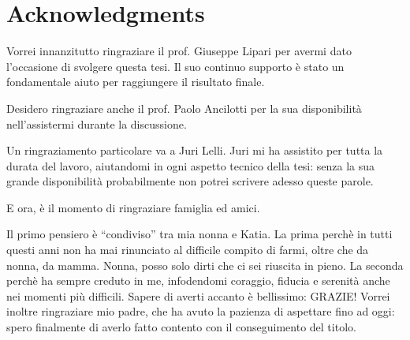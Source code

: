 \chapter{Acknowledgments}

Vorrei innanzitutto ringraziare il prof. Giuseppe Lipari per avermi dato
l'occasione di svolgere questa tesi. Il suo continuo supporto \`e stato un
fondamentale aiuto per raggiungere il risultato finale.

Desidero ringraziare anche il prof. Paolo Ancilotti per la sua disponibilit\`a
nell'assistermi durante la discussione.

Un ringraziamento particolare va a Juri Lelli. Juri mi ha assistito per
tutta la durata del lavoro, aiutandomi in ogni aspetto tecnico della tesi:
senza la sua grande disponibilit\`a probabilmente non potrei scrivere adesso 
queste parole.

E ora, \`e il momento di ringraziare famiglia ed amici.

Il primo pensiero \`e ``condiviso'' tra mia nonna e Katia. La prima perch\`e
in tutti questi anni non ha mai rinunciato al difficile compito di farmi,
oltre che da nonna, da mamma. Nonna, posso solo dirti che ci sei riuscita
in pieno. La seconda perch\`e ha sempre creduto in me, infodendomi
coraggio, fiducia e serenit\`a anche nei momenti più difficili. Sapere di
averti accanto \`e bellissimo: GRAZIE!
Vorrei inoltre ringraziare mio padre, che ha avuto la pazienza di aspettare
fino ad oggi: spero finalmente di averlo fatto contento con il conseguimento 
del titolo.

